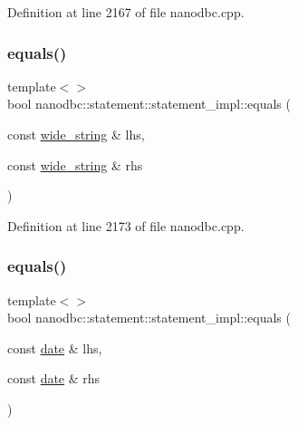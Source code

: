 Definition at line 2167 of file nanodbc.\+cpp.

\mbox{\label{classnanodbc_1_1statement_1_1statement__impl_a1e345aa943862d3dd32b59256fb5ed04}} 
\subsubsection{\texorpdfstring{equals()}{equals()}\hspace{0.1cm}{\footnotesize\ttfamily [3/6]}}
{\footnotesize\ttfamily template$<$$>$ \\
bool nanodbc\+::statement\+::statement\+\_\+impl\+::equals (\begin{DoxyParamCaption}\item[{const \mbox{\hyperlink{namespacenanodbc_aeddf33f0df2bb9ba05323112e3aed316}{wide\+\_\+string}} \&}]{lhs,  }\item[{const \mbox{\hyperlink{namespacenanodbc_aeddf33f0df2bb9ba05323112e3aed316}{wide\+\_\+string}} \&}]{rhs }\end{DoxyParamCaption})}



Definition at line 2173 of file nanodbc.\+cpp.

\mbox{\label{classnanodbc_1_1statement_1_1statement__impl_adb037f0de75f88c08f037431721ff4f5}} 
\subsubsection{\texorpdfstring{equals()}{equals()}\hspace{0.1cm}{\footnotesize\ttfamily [4/6]}}
{\footnotesize\ttfamily template$<$$>$ \\
bool nanodbc\+::statement\+::statement\+\_\+impl\+::equals (\begin{DoxyParamCaption}\item[{const \mbox{\hyperlink{structnanodbc_1_1date}{date}} \&}]{lhs,  }\item[{const \mbox{\hyperlink{structnanodbc_1_1date}{date}} \&}]{rhs }\end{DoxyParamCaption})}



